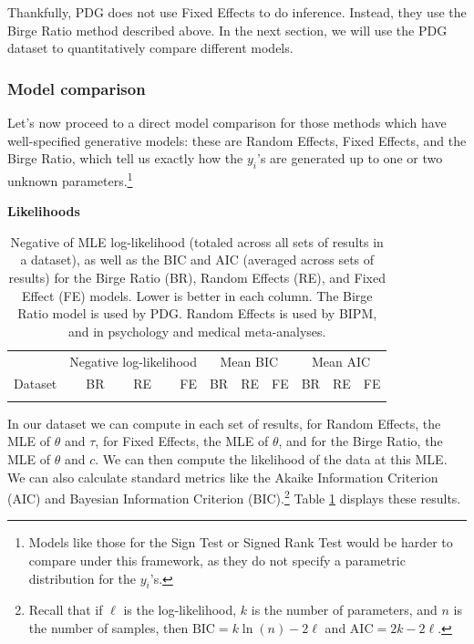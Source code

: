 \documentclass[12pt]{article}
\begin{document}
Thankfully, PDG does not use Fixed Effects to do inference. Instead, they use the Birge Ratio method described above. In the next section, we will use the PDG dataset to quantitatively compare different models.

\subsubsection{Model comparison}\label{model-comparison}

Let's now proceed to a direct model comparison for those methods which have well-specified generative models: these are Random Effects, Fixed Effects, and the Birge Ratio, which tell us exactly how the $y_i$'s are generated up to one or two unknown parameters.\footnote{Models like those for the Sign Test or Signed Rank Test would be harder to compare under this framework, as they do not specify a parametric distribution for the $y_i$'s.}

\textbf{Likelihoods}

\begin{table}
  \centering
  \caption{Negative of MLE log-likelihood (totaled across all sets of results in a dataset), as well as the BIC and AIC (averaged across sets of results) for the Birge Ratio (BR), Random Effects (RE), and Fixed Effect (FE) models. Lower is better in each column. The Birge Ratio model is used by PDG. Random Effects is used by BIPM, and in psychology and medical meta-analyses.}
  \label{tab:noground-loglike}
  \smaller
  \begin{tabular}{l|rrr|rrr|rrr}
  \hline & \multicolumn{3}{c|}{Negative log-likelihood} & \multicolumn{3}{c|}{Mean BIC} & \multicolumn{3}{c}{Mean AIC} \\
  Dataset & BR & RE & FE & BR & RE & FE & BR & RE & FE\\\hline
  \\\hline
  \end{tabular}
\end{table}

In our dataset we can compute in each set of results, for Random Effects, the MLE of $\theta$ and $\tau$, for Fixed Effects, the MLE of $\theta$, and for the Birge Ratio, the MLE of $\theta$ and $c$. We can then compute the likelihood of the data at this MLE. We can also calculate standard metrics like the Akaike Information Criterion (AIC) and Bayesian Information Criterion (BIC).\footnote{Recall that if $\ell$ is the log-likelihood, $k$ is the number of parameters, and $n$ is the number of samples, then $\mathrm{BIC}=k\ln(n)-2\ell$ and $\mathrm{AIC}=2k-2\ell$.}  Table \ref{tab:noground-loglike} displays these results.
\end{document}
